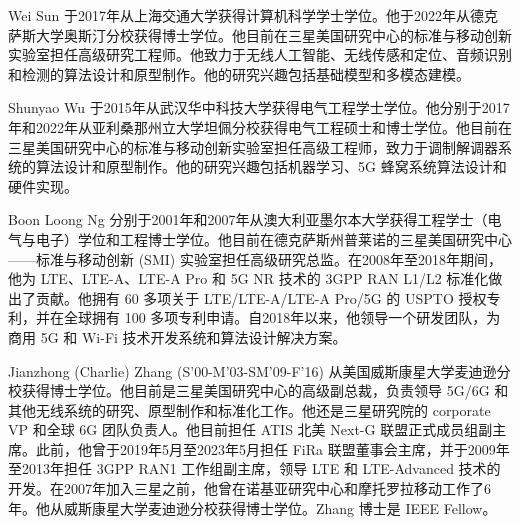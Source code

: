 \documentclass[journal]{IEEEtran}
\begin{document}
\begin{IEEEbiography}{Wei Sun} 于2017年从上海交通大学获得计算机科学学士学位。他于2022年从德克萨斯大学奥斯汀分校获得博士学位。他目前在三星美国研究中心的标准与移动创新实验室担任高级研究工程师。他致力于无线人工智能、无线传感和定位、音频识别和检测的算法设计和原型制作。他的研究兴趣包括基础模型和多模态建模。
\end{IEEEbiography}

\begin{IEEEbiography}{Shunyao Wu} 于2015年从武汉华中科技大学获得电气工程学士学位。他分别于2017年和2022年从亚利桑那州立大学坦佩分校获得电气工程硕士和博士学位。他目前在三星美国研究中心的标准与移动创新实验室担任高级工程师，致力于调制解调器系统的算法设计和原型制作。他的研究兴趣包括机器学习、5G 蜂窝系统算法设计和硬件实现。
\end{IEEEbiography}

\begin{IEEEbiography}{Boon Loong Ng} 分别于2001年和2007年从澳大利亚墨尔本大学获得工程学士（电气与电子）学位和工程博士学位。他目前在德克萨斯州普莱诺的三星美国研究中心——标准与移动创新 (SMI) 实验室担任高级研究总监。在2008年至2018年期间，他为 LTE、LTE-A、LTE-A Pro 和 5G NR 技术的 3GPP RAN L1/L2 标准化做出了贡献。他拥有 60 多项关于 LTE/LTE-A/LTE-A Pro/5G 的 USPTO 授权专利，并在全球拥有 100 多项专利申请。自2018年以来，他领导一个研发团队，为商用 5G 和 Wi-Fi 技术开发系统和算法设计解决方案。
\end{IEEEbiography}

\begin{IEEEbiography}{Jianzhong (Charlie) Zhang} (S’00-M’03-SM’09-F’16) 从美国威斯康星大学麦迪逊分校获得博士学位。他目前是三星美国研究中心的高级副总裁，负责领导 5G/6G 和其他无线系统的研究、原型制作和标准化工作。他还是三星研究院的 corporate VP 和全球 6G 团队负责人。他目前担任 ATIS 北美 Next-G 联盟正式成员组副主席。此前，他曾于2019年5月至2023年5月担任 FiRa 联盟董事会主席，并于2009年至2013年担任 3GPP RAN1 工作组副主席，领导 LTE 和 LTE-Advanced 技术的开发。在2007年加入三星之前，他曾在诺基亚研究中心和摩托罗拉移动工作了6年。他从威斯康星大学麦迪逊分校获得博士学位。Zhang 博士是 IEEE Fellow。
\end{IEEEbiography}
\end{document}
